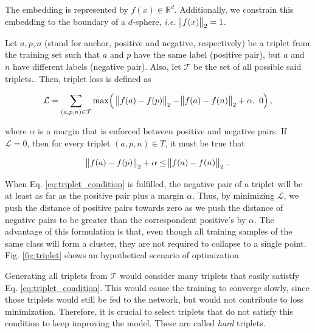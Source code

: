 The embedding is represented by $f(x) \in \mathbb{R}^d$. Additionally, we constrain this embedding to the boundary of a $d$-sphere, \textit{i.e.} $\norm{f(x)}_2 = 1$.

Let $a, p, n$ (stand for anchor, positive and negative, respectively) be a triplet from the training set such that $a$ and $p$ have the same label (positive pair), but $a$ and $n$ have different labels (negative pair). Also, let $\mathcal{T}$ be the set of all possible said triplets.. Then, triplet loss is defined as

\begin{equation}\label{eq:triplet}
\mathcal{L} = \sum_{(a, p, n) \in \mathcal{T}} %
\max\Bigl(\ \norm{f(a) - f(p)}_2 - \norm{f(a) - f(n)}_2 + \alpha,\ 0\Bigr)\,,
\end{equation}

where $\alpha$ is a margin that is enforced between positive and negative pairs. If $\mathcal{L} = 0$, then for every triplet $(a, p, n) \in T$, it must be true that

\begin{equation}\label{eq:triplet_condition}
\norm{f(a) - f(p)}_2 + \alpha \leq \norm{f(a) - f(n)}_2 \,.
\end{equation}

When Eq. \ref{eq:triplet_condition} is fulfilled, the negative pair of a triplet will be at least as far as the positive pair plus a margin $\alpha$. Thus, by minimizing $\mathcal{L}$, we push the distance of positive pairs towards zero as we push the distance of negative pairs to be greater than the correspondent positive's by $\alpha$. The advantage of this formulation is that, even though all training samples of the same class will form a cluster, they are not required to collapse to a single point. Fig. \ref{fig:triplet} shows an hypothetical scenario of optimization.

Generating all triplets from $\mathcal{T}$ would consider many triplets that easily satistfy Eq. \ref{eq:triplet_condition}. This would cause the training to converge slowly, since those triplets would still be fed to the network, but would not contribute to loss minimization. Therefore, it is crucial to select triplets that do not satisfy this condition to keep improving the model. These are called \textit{hard} triplets.

